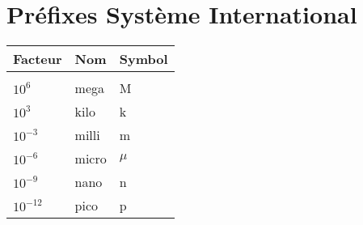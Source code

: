 \section{Préfixes Système International}
\begin{tabular}{lll}
Facteur    & Nom   & Symbol \\\hline\\[-1em]
$10^{6}$   & mega  & M      \\
$10^3$     & kilo  & k      \\
$10^{-3}$  & milli & m      \\
$10^{-6}$  & micro & $\mu$  \\
$10^{-9}$  & nano  & n      \\
$10^{-12}$ & pico  & p     
\end{tabular}